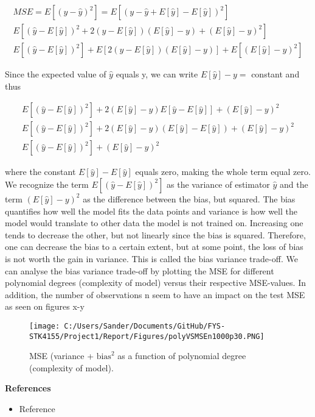 \documentclass[12pt,a4paper]{article}
\begin{document}
\begin{equation}\label{eq:mseDerive}
\begin{aligned}
MSE = E[(y-\hat{y})^2] = E[(y-\hat{y} + E[\hat{y}] - E[\hat{y}])^2]
\\
E[(\hat{y} - E[\hat{y}])^2 + 2(\hat{y} - E[\hat{y}])(E[\hat{y}]-y) + (E[\hat{y}]-y)^2]
\\
E[(\hat{y} - E[\hat{y}])^2] + E[2(\hat{y} - E[\hat{y}])(E[\hat{y}]-y)] + E[(E[\hat{y}]-y)^2]
\end{aligned}
\end{equation}

\noindent Since the expected value of $\hat{y}$ equals y, we can write $E[\hat{y}] - y =$ constant and thus

\begin{equation}\label{eq:mseDerive2}
\begin{aligned}
E[(\hat{y} - E[\hat{y}])^2] + 2(E[\hat{y}]-y)E[\hat{y}-E[\hat{y}]] + (E[\hat{y}]-y)^2
\\
E[(\hat{y} - E[\hat{y}])^2] + 2(E[\hat{y}]-y)(E[\hat{y}] - E[\hat{y}])+ (E[\hat{y}]-y)^2
\\
E[(\hat{y} - E[\hat{y}])^2] + (E[\hat{y}]-y)^2
\end{aligned}
\end{equation}

where the constant $E[\hat{y}] - E[\hat{y}]$ equals zero, making the whole term equal zero. 
\\
We recognize the term $E[(\hat{y} - E[\hat{y}])^2]$ as the variance of estimator $\hat{y}$ and the term $(E[\hat{y}]-y)^2$ as the difference between the bias, but squared. The bias quantifies how well the model fits the data points and variance is how well the model would translate to other data the model is not trained on. Increasing one tends to decrease the other, but not linearly since the bias is squared. Therefore, one can decrease the bias to a certain extent, but at some point, the loss of bias is not worth the gain in variance. This is called the bias variance trade-off. We can analyse the bias variance trade-off by plotting the MSE for different polynomial degrees (complexity of model) versus their respective MSE-values. In addition, the number of observations n seem to have an impact on the test MSE as seen on figures x-y

\begin{figure}[H]
\centering
\texttt{[image: C:/Users/Sander/Documents/GitHub/FYS-STK4155/Project1/Report/Figures/polyVSMSEn1000p30.PNG]}
\caption{\label{fig:bvto} MSE (variance + $\textrm{bias}^2$ as a function of polynomial degree (complexity of model).}
\end{figure}

\newpage

\begin{center}
\Large{\textbf{References}}
\end{center}

\begin{itemize}
  \item Reference
\end{itemize}
\end{document}
